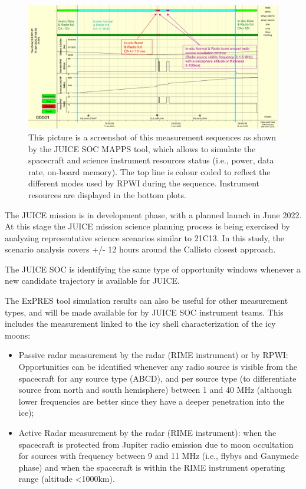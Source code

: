 \documentclass[referee]{aa}
\begin{document}
\begin{figure}
    \centering
    \includegraphics[width=\textwidth]{21C13_RPWI_Science_timeline_MAPPS.png}
    \caption{This picture is a screenshot of this measurement sequences as shown by the JUICE SOC MAPPS tool, which allows to simulate the spacecraft and science instrument resources status (i.e., power, data rate, on-board memory). The top line is colour coded to reflect the different modes used by RPWI during the sequence. Instrument resources are displayed in the bottom plots. }
    \label{JUICE SOC-fig3}
\end{figure}



The JUICE mission is in development phase, with a planned launch in June 2022. At this stage the JUICE mission science planning process is being exercised by analyzing representative science scenarios similar to 21C13. In this study, the scenario analysis covers +/- 12 hours around the Callisto closest approach.

The JUICE SOC is identifying the same type of opportunity windows whenever a new candidate trajectory is available for JUICE.

The ExPRES tool simulation results can also be useful for other measurement types, and will be made available for by JUICE SOC instrument teams. This includes the measurement linked to the icy shell characterization of the icy moons:
\begin{itemize}
    \item Passive radar measurement by the radar (RIME instrument) or by RPWI: Opportunities can be identified whenever any radio source is visible from the spacecraft for any source type (ABCD), and per source type (to differentiate source from north and south hemisphere) between 1 and 40 MHz (although lower frequencies are better since they have a deeper penetration into the ice);
    \item Active Radar measurement by the radar (RIME instrument): when the spacecraft is protected from Jupiter radio emission due to moon occultation for sources with frequency between 9 and 11 MHz (i.e., flybys and Ganymede phase) and when the spacecraft is within the RIME instrument operating range (altitude <1000km).
\end{itemize}
\end{document}
